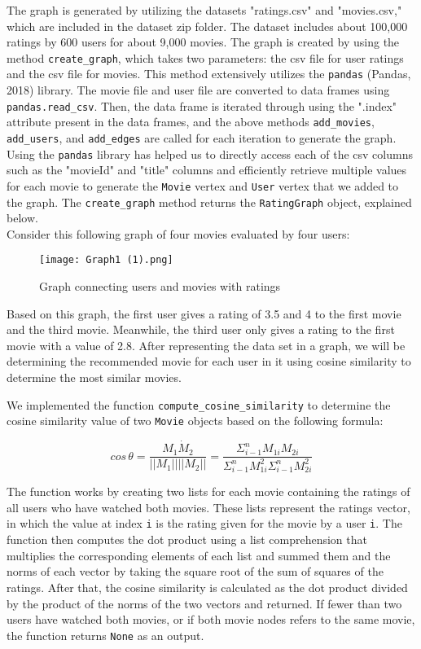 \documentclass[fontsize=11pt]{article}
\begin{document}
The graph is generated by utilizing the datasets "ratings.csv" and "movies.csv," which are included in the dataset zip folder. The dataset includes about 100,000 ratings by 600 users for about 9,000 movies. The graph is created by using the method \texttt{create\_graph}, which takes two parameters: the csv file for user ratings and the csv file for movies. This method extensively utilizes the \texttt{pandas} (Pandas, 2018) library. The movie file and user file are converted to data frames using \texttt{pandas.read\_csv}. Then, the data frame is iterated through using the ".index" attribute present in the data frames, and the above methods \texttt{add\_movies}, \texttt{add\_users}, and \texttt{add\_edges} are called for each iteration to generate the graph. Using the \texttt{pandas} library has helped us to directly access each of the csv columns such as the "movieId" and "title" columns and efficiently retrieve multiple values for each movie to generate the \texttt{Movie} vertex and \texttt{User} vertex that we added to the graph. The \texttt{create\_graph} method returns the \texttt{RatingGraph} object, explained below.\\

\quad Consider this following graph of four movies evaluated by four users:

\begin{figure}[htp]
    \centering
    \texttt{[image: Graph1 (1).png]}
    \caption{Graph connecting users and movies with ratings}
    \label{fig:Graph2}
\end{figure}

\quad Based on this graph, the first user gives a rating of 3.5 and 4 to the first movie and the third movie. Meanwhile, the third user only gives a rating to the first movie with a value of 2.8. After representing the data set in a graph, we will be determining the recommended movie for each user in it using cosine similarity to determine the most similar movies.

\newpage

\quad We implemented the function \texttt{compute\_cosine\_similarity} to determine the cosine similarity value of two \texttt{Movie} objects based on the following formula:

\[ cos \, \theta = \frac{M_1 \dot M_2}{|| M_1 || || M_2||} = \frac{\Sigma_{i-1}^n M_{1i} M_{2i}}{\Sigma_{i-1}^n M_{1i}^2 \Sigma_{i-1}^n M_{2i}^2}\]

\quad The function works by creating two lists for each movie containing the ratings of all users who have watched both movies. These lists represent the ratings vector, in which the value at index \texttt{i} is the rating given for the movie by a user \texttt{i}. The function then computes the dot product using a list comprehension that multiplies the corresponding elements of each list and summed them and the norms of each vector by taking the square root of the sum of squares of the ratings. After that, the cosine similarity is calculated as the dot product divided by the product of the norms of the two vectors and returned. If fewer than two users have watched both movies, or if both movie nodes refers to the same movie, the function returns \texttt{None} as an output.\\
\end{document}
